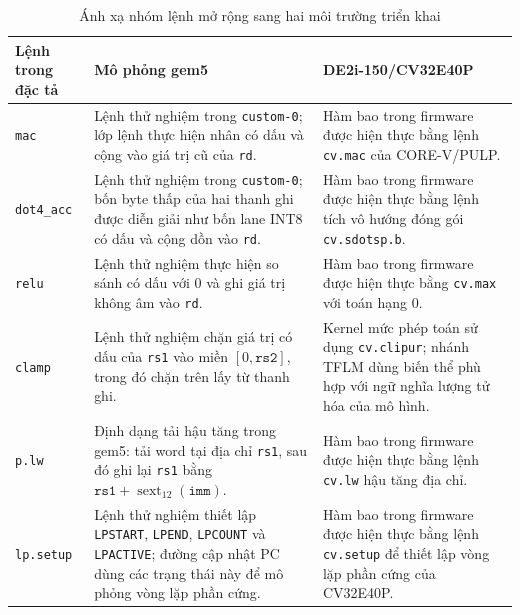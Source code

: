 \documentclass[../DoAn.tex]{subfiles}
\begin{document}
\begin{table}[H]
    \centering
    \small
    \renewcommand{\arraystretch}{1.18}
    \begin{tabular}{|>{\raggedright\arraybackslash}p{2.55cm}|>{\raggedright\arraybackslash}p{5.05cm}|>{\raggedright\arraybackslash}p{5.05cm}|}
        \hline
        \textbf{Lệnh trong đặc tả} & \textbf{Mô phỏng gem5} & \textbf{DE2i-150/CV32E40P} \\
        \hline
        \texttt{mac} & Lệnh thử nghiệm trong \texttt{custom-0}; lớp lệnh thực hiện nhân có dấu và cộng vào giá trị cũ của \texttt{rd}. & Hàm bao trong firmware được hiện thực bằng lệnh \texttt{cv.mac} của CORE-V/PULP. \\
        \hline
        \texttt{dot4\_acc} & Lệnh thử nghiệm trong \texttt{custom-0}; bốn byte thấp của hai thanh ghi được diễn giải như bốn lane INT8 có dấu và cộng dồn vào \texttt{rd}. & Hàm bao trong firmware được hiện thực bằng lệnh tích vô hướng đóng gói \texttt{cv.sdotsp.b}. \\
        \hline
        \texttt{relu} & Lệnh thử nghiệm thực hiện so sánh có dấu với 0 và ghi giá trị không âm vào \texttt{rd}. & Hàm bao trong firmware được hiện thực bằng \texttt{cv.max} với toán hạng 0. \\
        \hline
        \texttt{clamp} & Lệnh thử nghiệm chặn giá trị có dấu của \texttt{rs1} vào miền \([0,\texttt{rs2}]\), trong đó chặn trên lấy từ thanh ghi. & Kernel mức phép toán sử dụng \texttt{cv.clipur}; nhánh TFLM dùng biến thể phù hợp với ngữ nghĩa lượng tử hóa của mô hình. \\
        \hline
        \texttt{p.lw} & Định dạng tải hậu tăng trong gem5: tải word tại địa chỉ \texttt{rs1}, sau đó ghi lại \texttt{rs1} bằng \(\texttt{rs1}+\operatorname{sext}_{12}(\texttt{imm})\). & Hàm bao trong firmware được hiện thực bằng lệnh \texttt{cv.lw} hậu tăng địa chỉ. \\
        \hline
        \texttt{lp.setup} & Lệnh thử nghiệm thiết lập \texttt{LPSTART}, \texttt{LPEND}, \texttt{LPCOUNT} và \texttt{LPACTIVE}; đường cập nhật PC dùng các trạng thái này để mô phỏng vòng lặp phần cứng. & Hàm bao trong firmware được hiện thực bằng lệnh \texttt{cv.setup} để thiết lập vòng lặp phần cứng của CV32E40P. \\
        \hline
    \end{tabular}
    \caption{Ánh xạ nhóm lệnh mở rộng sang hai môi trường triển khai}
    \label{tab:semantics-deployment-mapping}
\end{table}
\end{document}
